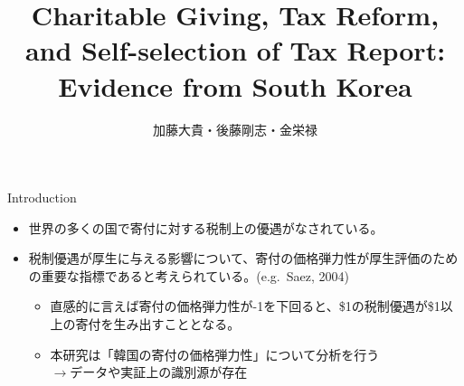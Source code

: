 \documentclass[dvipdfmx,10pt]{beamer}
\begin{document}
	\author{加藤大貴・後藤剛志・金栄禄}
	\title{Charitable Giving, Tax Reform, and Self-selection of Tax Report:
		Evidence from South Korea}
	\begin{frame}[plain]
		\maketitle
	\end{frame}
	
	\begin{frame}{Introduction}
		\protect\hypertarget{introduction}{}
		\begin{itemize}
			\item 世界の多くの国で寄付に対する税制上の優遇がなされている。
			\item 税制優遇が厚生に与える影響について、寄付の価格弾力性が厚生評価のための重要な指標であると考えられている。(e.g.~Saez, 2004)
			\begin{itemize}
				\item 直感的に言えば寄付の価格弾力性が-1を下回ると、\$1の税制優遇が\$1以上の寄付を生み出すこととなる。
				\item 本研究は「韓国の寄付の価格弾力性」について分析を行う\\
				$\to$データや実証上の識別源が存在
			\end{itemize}
		\end{itemize}
	\end{frame}
	
\end{document}
